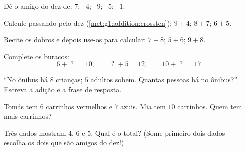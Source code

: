 \begin{exercise}[$\star$]\label{exo:g1:addition:3}
Dê o amigo do dez de: $7$; \ $4$; \ $9$; \ $5$; \ $1$.
\end{exercise}

\begin{exercise}[$\star$]\label{exo:g1:addition:4}
Calcule passando pelo dez (\cref{met:g1:addition:crossten}):
$9 + 4$; \quad $8 + 7$; \quad $6 + 5$.
\end{exercise}

\begin{exercise}[$\star$]\label{exo:g1:addition:5}
Recite os dobros e depois use-os para calcular: $7 + 8$; \quad
$5 + 6$; \quad $9 + 8$.
\end{exercise}

\begin{exercise}[$\star$]\label{exo:g1:addition:6}
Complete os buracos:
\[
6 + \;?\; = 10, \qquad
\;?\; + 5 = 12, \qquad
10 + \;?\; = 17 .
\]
\end{exercise}

\begin{exercise}[$\star$]\label{exo:g1:addition:7}
``No ônibus há $8$ crianças; $5$ adultos sobem. Quantas pessoas há
no ônibus?'' Escreva a adição e a frase de resposta.
\end{exercise}

\begin{exercise}[$\star$]\label{exo:g1:addition:8}
Tomás tem $6$ carrinhos vermelhos e $7$ azuis. Mia tem $10$
carrinhos. Quem tem mais carrinhos?
\end{exercise}

\begin{exercise}[$\star\star$]\label{exo:g1:addition:9}
Três dados mostram $4$, $6$ e $5$. Qual é o total? (Some primeiro
dois dados --- escolha os dois que são amigos do dez!)
\end{exercise}
